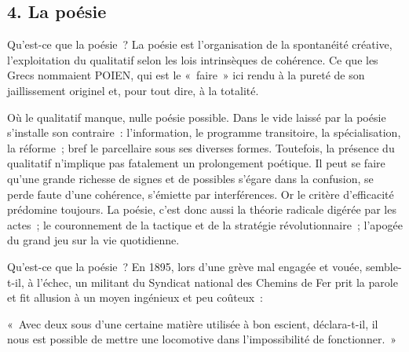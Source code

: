 \documentclass[french,twoside]{book} %
\newenvironment{quoteblock}%
  {\begin{quoting}}
  {\end{quoting}}
\newenvironment{quotebar}{%
    \def\FrameCommand{{\color{rubric!10!}\vrule width 0.5em} \hspace{0.9em}}%
    \def\OuterFrameSep{\itemsep} %
    \MakeFramed {\advance\hsize-\width \FrameRestore}
  }%
  {%
    \endMakeFramed
  }
\renewenvironment{quoteblock}%
  {%
    \savenotes
    \setstretch{0.9}
    \normalfont
    \begin{quotebar}
  }
  {%
    \end{quotebar}
    \spewnotes
  }
\begin{document}
\subsection[{4. La poésie}]{\textsc{4.} La poésie}
\noindent Qu’est-ce que la poésie ? La poésie est l’organisation de la spontanéité créative, l’exploitation du qualitatif selon les lois intrinsèques de cohérence. Ce que les Grecs nommaient POIEN, qui est le « faire » ici rendu à la pureté de son jaillissement originel et, pour tout dire, à la totalité.\par
Où le qualitatif manque, nulle poésie possible. Dans le vide laissé par la poésie s’installe son contraire : l’information, le programme transitoire, la spécialisation, la réforme ; bref le parcellaire sous ses diverses formes. Toutefois, la présence du qualitatif n’implique pas fatalement un prolongement poétique. Il peut se faire qu’une grande richesse de signes et de possibles s’égare dans la confusion, se perde faute d’une cohérence, s’émiette par interférences. Or le critère d’efficacité prédomine toujours. La poésie, c’est donc aussi la théorie radicale digérée par les actes ; le couronnement de la tactique et de la stratégie révolutionnaire ; l’apogée du grand jeu sur la vie quotidienne.\par
Qu’est-ce que la poésie ? En 1895, lors d’une grève mal engagée et vouée, semble-t-il, à l’échec, un militant du Syndicat national des Chemins de Fer prit la parole et fit allusion à un moyen ingénieux et peu coûteux :\par

\begin{quoteblock}
\noindent « Avec deux sous d’une certaine matière utilisée à bon escient, déclara-t-il, il nous est possible de mettre une locomotive dans l’impossibilité de fonctionner. »\end{quoteblock}
\end{document}
